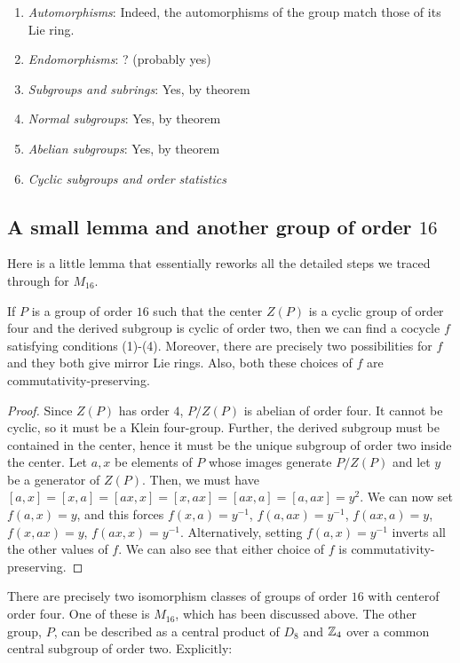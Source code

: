 \documentclass[10pt]{amsart}
\begin{document}
\begin{enumerate}
\item {\em Automorphisms}: Indeed, the automorphisms of the group
  match those of its Lie ring.
\item {\em Endomorphisms}: ? (probably yes)
\item {\em Subgroups and subrings}: Yes, by theorem
\item {\em Normal subgroups}: Yes, by theorem
\item {\em Abelian subgroups}: Yes, by theorem
\item {\em Cyclic subgroups and order statistics}
\end{enumerate}

\subsection{A small lemma and another group of order $16$}

Here is a little lemma that essentially reworks all the detailed steps
we traced through for $M_{16}$.

\begin{lemma}
  If $P$ is a group of order $16$ such that the center $Z(P)$ is a
  cyclic group of order four and the derived subgroup is cyclic of
  order two, then we can find a cocycle $f$ satisfying conditions
  (1)-(4). Moreover, there are precisely two possibilities for $f$ and
  they both give mirror Lie rings. Also, both these choices of $f$ are
  commutativity-preserving.
\end{lemma}

\begin{proof}
  Since $Z(P)$ has order $4$, $P/Z(P)$ is abelian of order four. It
  cannot be cyclic, so it must be a Klein four-group. Further, the
  derived subgroup must be contained in the center, hence it must be
  the unique subgroup of order two inside the center. Let $a,x$ be
  elements of $P$ whose images generate $P/Z(P)$ and let $y$ be a
  generator of $Z(P)$. Then, we must have $[a,x] = [x,a] = [ax,x] =
  [x,ax] = [ax,a] = [a,ax] = y^2$. We can now set $f(a,x) = y$, and
  this forces $f(x,a) = y^{-1}$, $f(a,ax) = y^{-1}$, $f(ax,a) = y$,
  $f(x,ax) = y$, $f(ax,x) = y^{-1}$. Alternatively, setting $f(a,x) =
  y^{-1}$ inverts all the other values of $f$. We can also see that
  either choice of $f$ is commutativity-preserving.
\end{proof}

There are precisely two isomorphism classes of groups of order $16$
with centerof order four. One of these is $M_{16}$, which has been
discussed above. The other group, $P$, can be described as a central
product of $D_8$ and $\mathbb{Z}_4$ over a common central subgroup of order
two. Explicitly:
\end{document}
